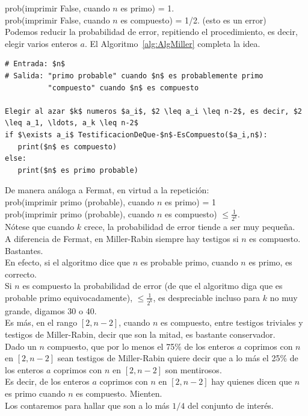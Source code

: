 prob(imprimir False, cuando $n$ es primo) = 1. \\
prob(imprimir False, cuando $n$ es compuesto) = 1/2. \quad (esto es un error) \\

Podemos reducir la probabilidad de error, repitiendo el procedimiento, es decir, elegir varios enteros $a$. El Algoritmo~\ref{alg:AlgMiller} completa la idea.

\begin{lstlisting}[caption={Algoritmo de Miller-Rabin}, label={alg:AlgMiller}, mathescape=true]
# Entrada: $n$
# Salida: "primo probable" cuando $n$ es probablemente primo
          "compuesto" cuando $n$ es compuesto

Elegir al azar $k$ numeros $a_i$, $2 \leq a_i \leq n-2$, es decir, $2 \leq a_1, \ldots, a_k \leq n-2$
if $\exists a_i$ TestificacionDeQue-$n$-EsCompuesto($a_i,n$):
   print($n$ es compuesto)
else:
   print($n$ es primo probable)
\end{lstlisting}

De manera análoga a Fermat, en virtud a la repetición: \\

prob(imprimir primo (probable), cuando $n$ es primo) = 1 \\
prob(imprimir primo (probable), cuando $n$ es compuesto) $\leq \frac{1}{2^k}$. \\

Nótese que cuando $k$ crece, la probabilidad de error tiende a ser muy pequeña. \\
A diferencia de Fermat, en Miller-Rabin siempre hay testigos si $n$ es compuesto. Bastantes. \\

En efecto, si el algoritmo dice que $n$ es probable primo, cuando $n$ es primo, es correcto. \\
Si $n$ es compuesto la probabilidad de error (de que el algoritmo diga que es probable primo equivocadamente), $\leq \frac{1}{2^k}$, es despreciable incluso para $k$ no muy grande, digamos 30 o 40. \\
Es más, en el rango $[2,n-2]$, cuando $n$ es compuesto, entre  testigos triviales y testigos de Miller-Rabin, decir que son la mitad, es bastante conservador. \\

Dado un $n$ compuesto, que por lo menos el 75\% de los enteros $a$ coprimos con $n$ en $[2, n-2]$ sean testigos de Miller-Rabin quiere decir que a lo más el 25\% de los enteros $a$ coprimos con $n$ en $[2, n-2]$ son mentirosos. \\
Es decir, de los enteros $a$ coprimos con $n$ en $[2, n-2]$ hay quienes dicen que $n$ es primo cuando $n$ es compuesto. Mienten. \\
Los contaremos para hallar que son a lo más $1/4$ del conjunto de interés.\\

